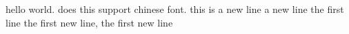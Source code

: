 \documentclass{article}
\begin{document}
hello world. does this support chinese font. this is a new line 
a new line
the first line
the first new line, the first new line
\end{document}
